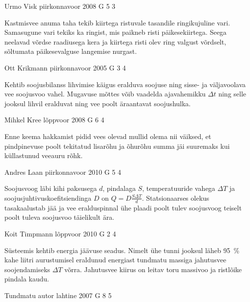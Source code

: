 \documentclass[11pt]{article}
\begin{document}
{%
{Urmo Visk} %
{piirkonnavoor} %
{2008} %
{G 5} %
{3} %
{

\ifHint
Kastmisvee anuma taha tekib kiirtega ristuvale tasandile ringikujuline vari. Samasugune vari tekiks ka ringist, mis paikneb risti päikesekiirtega. Seega neelavad võrdse raadiusega kera ja kiirtega risti olev ring valgust võrdselt, sõltumata päikesevalguse langemise nurgast.
\fi
}

{Ott Krikmann} %
{piirkonnavoor} %
{2005} %
{G 3} %
{4} %
{

\ifHint
Kehtib soojusbilanss lihvimise käigus eralduva soojuse ning sisse- ja väljavoolava vee soojusvoo vahel. Mugavuse mõttes võib vaadelda ajavahemikku $\Delta t$ ning selle jooksul lihvil eralduvat ning vee poolt äraantavat soojushulka.
\fi
}

{Mihkel Kree} %
{lõppvoor} %
{2008} %
{G 6} %
{4} %
{

\ifHint
Enne keema hakkamist pidid vees olevad mullid olema nii väiksed, et pindpinevuse poolt tekitatud lisarõhu ja õhurõhu summa jäi suuremaks kui küllastunud veeauru rõhk.
\fi
}

{Andres Laan} %
{piirkonnavoor} %
{2010} %
{G 5} %
{4} %
{

\ifHint
Soojusvoog läbi kihi paksusega $d$, pindalaga $S$, temperatuuride vahega $\Delta T$ ja soojusjuhtivuskoefitsiendinga $D$ on $Q = D\frac{S\Delta T}{d}$. Statsionaarses olekus tasakaalustab jää ja vee eralduspinnal ühe plaadi poolt tulev soojusvoog teiselt poolt tuleva soojusvoo täielikult ära. 
\fi
}

{Koit Timpmann} %
{lõppvoor} %
{2010} %
{G 2} %
{4} %
{

\ifHint
Süsteemis kehtib energia jäävuse seadus. Nimelt ühe tunni jooksul läheb \SI{95}{\%} kahe liitri aurustumisel eraldunud energiast tundmatu massiga jahutusvee soojendamiseks $\Delta T$ võrra. Jahutusvee kiirus on leitav toru massivoo ja ristlõike pindala kaudu.
\fi
}

{Tundmatu autor} %
{lahtine} %
{2007} %
{G 8} %
{5} %
{

}}
\end{document}
